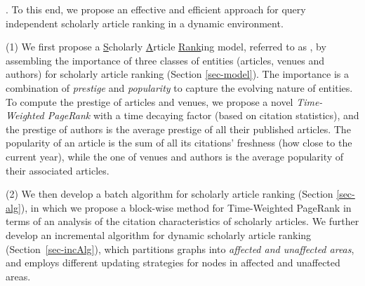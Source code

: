 
.
To this end, we propose an effective and efficient approach for query independent scholarly article ranking in a dynamic environment.

\sstab(1) We first  propose a \underline{S}cholarly \underline{A}rticle \underline{Rank}ing model, referred to as \ensemblerank, by assembling the importance of three classes of entities (articles, venues and authors) for scholarly article ranking (Section \ref{sec-model}).
%
The importance is a combination of {\em prestige} and {\em popularity} to capture the evolving nature of entities.
%
To compute the prestige of articles and venues, we propose a novel {\em Time-Weighted PageRank} with a time decaying factor (based on citation statistics), and the prestige of authors is the average prestige of all their published articles.
%
The popularity of an article is the sum of all its citations' freshness (how close to the current year), while the one of venues and authors is the average popularity of their associated articles.
%
%


\sstab(2)  We then develop  a batch algorithm for scholarly article ranking (Section \ref{sec-alg}), in which we propose a block-wise method for Time-Weighted PageRank in terms of an analysis of the citation characteristics of scholarly articles.
%
We further develop an incremental algorithm for dynamic scholarly article ranking (Section~\ref{sec-incAlg}), which partitions graphs into  {\em affected and unaffected areas}, and employs different updating strategies for nodes in affected and unaffected areas.


